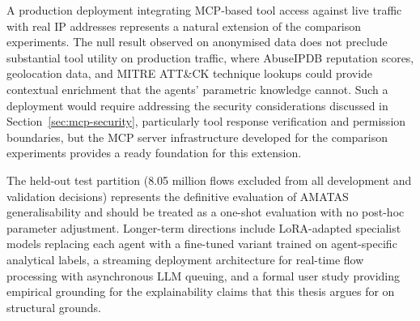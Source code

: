 A production deployment integrating MCP-based tool access against live traffic with real IP addresses represents a natural extension of the comparison experiments. The null result observed on anonymised data does not preclude substantial tool utility on production traffic, where AbuseIPDB reputation scores, geolocation data, and MITRE ATT\&CK technique lookups could provide contextual enrichment that the agents' parametric knowledge cannot. Such a deployment would require addressing the security considerations discussed in Section~\ref{sec:mcp-security}, particularly tool response verification and permission boundaries, but the MCP server infrastructure developed for the comparison experiments provides a ready foundation for this extension.

The held-out test partition (8.05 million flows excluded from all development and validation decisions) represents the definitive evaluation of AMATAS generalisability and should be treated as a one-shot evaluation with no post-hoc parameter adjustment. Longer-term directions include LoRA-adapted specialist models replacing each agent with a fine-tuned variant trained on agent-specific analytical labels, a streaming deployment architecture for real-time flow processing with asynchronous LLM queuing, and a formal user study providing empirical grounding for the explainability claims that this thesis argues for on structural grounds.
